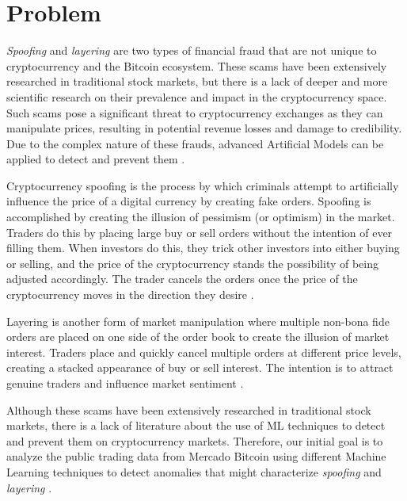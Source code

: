 \section{Problem}
\textit{Spoofing} and \textit{layering} are two types of financial fraud that are not unique to cryptocurrency and the
Bitcoin ecosystem. These scams have been extensively researched in traditional stock markets, but there is a lack of
deeper and more scientific research on their prevalence and impact in the cryptocurrency space. Such scams pose a
significant threat to cryptocurrency exchanges as they can manipulate prices, resulting in potential revenue losses and
damage to credibility. Due to the complex nature of these frauds, advanced Artificial Models can be applied to detect
and prevent them \cite{zhang2020financial, zainal2018review}.

Cryptocurrency spoofing is the process by which criminals attempt to artificially influence the price of a digital
currency by creating fake orders. Spoofing is accomplished by creating the illusion of pessimism (or optimism) in the
market. Traders do this by placing large buy or sell orders without the intention of ever filling them. When investors
do this, they trick other investors into either buying or selling, and the price of the cryptocurrency stands the
possibility of being adjusted accordingly. The trader cancels the orders once the price of the cryptocurrency moves in
the direction they desire \cite{hasbrouck2013spoofing}.

Layering is another form of market manipulation where multiple non-bona fide orders are placed on one side of the order
book to create the illusion of market interest. Traders place and quickly cancel multiple orders at different price
levels, creating a stacked appearance of buy or sell interest. The intention is to attract genuine traders and influence
market sentiment \cite{brogaard2014market}.

Although these scams have been extensively researched in traditional stock markets, there is a lack of literature about
the use of ML techniques to detect and prevent them on cryptocurrency markets. Therefore, our initial goal is to analyze
the public trading data from Mercado Bitcoin using different Machine Learning techniques to detect anomalies that might
characterize \textit{spoofing} and \textit{layering} \cite{bhattacharyya2011survey}.